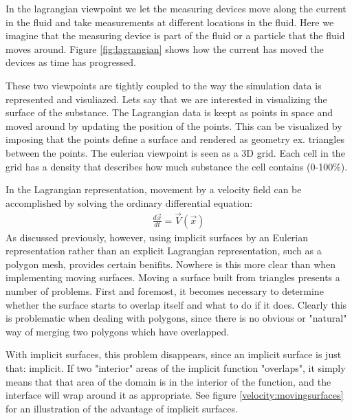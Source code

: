 In the lagrangian viewpoint we let the measuring devices move along
the current in the fluid and take measurements at different locations
in the fluid. Here we imagine that the measuring device is part of the
fluid or a particle that the fluid moves around. Figure
\ref{fig:lagrangian} shows how the current has moved the devices as
time has progressed.

These two viewpoints are tightly coupled to the way the simulation data
is represented and visuliazed. Lets say that we are interested in
visualizing the surface of the substance.
%
The Lagrangian data is keept as points in space and moved around by
updating the position of the points. This can be visualized by
imposing that the points define a surface and rendered as geometry
ex. triangles between the points.
%
The eulerian viewpoint is seen as a 3D grid. Each cell in the grid has
a density that describes how much substance the cell contains (0-100\%).

In the Lagrangian representation, movement by a velocity field can be accomplished by solving the ordinary differential equation:
\begin{eqnarray}
\frac{d\vec{x}}{dt} = \vec{V}\left(\vec{x}\right)
\end{eqnarray}
As discussed previously, however, using implicit surfaces by an Eulerian representation rather than an explicit Lagrangian representation, such as a polygon mesh, provides certain benifits. Nowhere is this more clear than when implementing moving surfaces. Moving a surface built from triangles presents a number of problems. First and foremost, it becomes necessary to determine whether the surface starts to overlap itself and what to do if it does. Clearly this is problematic when dealing with polygons, since there is no obvious or "natural" way of merging two polygons which have overlapped.


With implicit surfaces, this problem disappears, since an implicit surface is just that: implicit. If two "interior" areas of the implicit function "overlaps", it simply means that that area of the domain is in the interior of the function, and the interface will wrap around it as appropriate. See figure \vref{velocity:movingsurfaces} for an illustration of the advantage of implicit surfaces.

